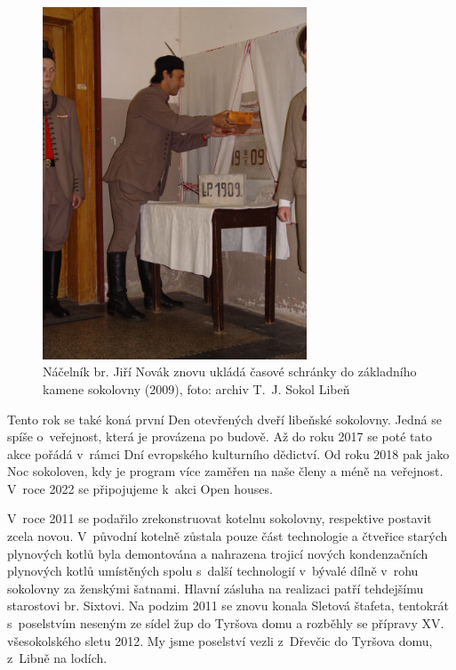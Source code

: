 \documentclass[a5paper, 11pt, twoside]{article}
\begin{document}
\begin{figure}[h]
  \centering
   \includegraphics[width=0.7\textwidth]{img/60_zakladni_kamen_jirkan.jpg}
  \caption*{Náčelník br. Jiří Novák znovu ukládá časové schránky do základního
  kamene sokolovny (2009), foto: archiv T.~J. Sokol Libeň}
\end{figure}

Tento rok se také koná první Den otevřených dveří libeňské sokolovny.
Jedná se spíše o~veřejnost, která je provázena po budově. Až do roku
2017 se poté tato akce pořádá v~rámci Dní evropského kulturního
dědictví. Od roku 2018 pak jako Noc sokoloven, kdy je program více
zaměřen na naše členy a méně na veřejnost. V~roce 2022 se připojujeme
k~akci Open houses.

V~roce 2011 se podařilo zrekonstruovat kotelnu sokolovny, respektive
postavit zcela novou. V~původní kotelně zůstala pouze část technologie a
čtveřice starých plynových kotlů byla demontována a nahrazena trojicí
nových kondenzačních plynových kotlů umístěných spolu s~další
technologií v~bývalé dílně v~rohu sokolovny za ženskými šatnami. Hlavní
zásluha na realizaci patří tehdejšímu starostovi br. Sixtovi. Na podzim
2011 se znovu konala Sletová štafeta, tentokrát s~poselstvím neseným ze
sídel žup do Tyršova domu a rozběhly se přípravy XV. všesokolského sletu
2012. My jsme poselství vezli z~Dřevčic do Tyršova domu, z~Libně na
lodích.
\end{document}
